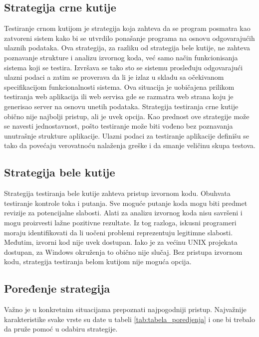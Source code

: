 \documentclass[a4paper]{article}
\begin{document}
{\subsection{Strategija crne kutije}
\label{subsec:crna_kutija}
Testiranje crnom kutijom je strategija koja zahteva da se program posmatra kao zatvoreni sistem kako bi se utvrdilo ponašanje programa na osnovu odgovarajućih ulaznih podataka. Ova strategija, za razliku od strategija bele kutije, ne zahteva poznavanje strukture i analizu
izvornog koda, već samo način funkcionisanja sistema koji se testira. Izvršava se tako sto se sistemu prosleđuju odgovarajući ulazni podaci a zatim se proverava da li je izlaz u skladu sa očekivanom specifikacijom funkcionalnosti sistema. Ova situacija je uobičajena prilikom testiranja web aplikacija ili web servisa gde se razmatra web strana koju je generisao server na osnovu unetih podataka. Strategija testiranja crne kutije obično nije najbolji pristup, ali je uvek opcija. Kao prednost ove strategije može se navesti jednostavnost, pošto testiranje može biti vođeno bez poznavanja unutrašnje strukture aplikacije. Ulazni podaci za testiranje aplikacije definišu se tako da povećaju verovatnoću nalaženja greške i da smanje veličinu skupa testova.

\subsection{Strategija bele kutije}
\label{subsec:bela_kutija}
Strategija testiranja bele kutije zahteva pristup izvornom kodu. Obuhvata testiranje kontrole toka i putanja. Sve moguće putanje koda mogu biti predmet revizije za potencijalne slabosti. Alati za analizu izvornog koda nisu savršeni i mogu proizvesti lažne pozitivne rezultate. Iz tog razloga, iskusni programeri moraju identifikovati da li uočeni problemi reprezentuju legitimne slabosti. Međutim, izvorni kod nije uvek dostupan. Iako je za većinu UNIX projekata dostupan, za Windows okruženja to obično nije slučaj. Bez pristupa izvornom kodu, strategija testiranja belom kutijom nije moguća opcija.

\subsection{Poređenje strategija}
\label{subsec:poredjenje_strategija}
Važno je u konkretnim situacijama prepoznati najpogodniji pristup. Najvažnije karakteristike svake vrste su date u tabeli \ref{tab:tabela_poredjenja} i one bi trebalo da pruže pomoć u odabiru strategije.

}
\end{document}
